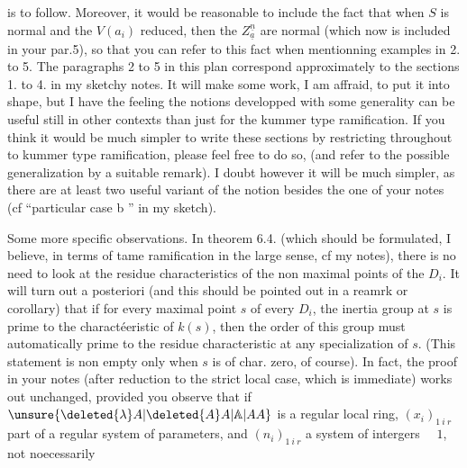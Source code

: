 is to follow. Moreover, it would be reasonable to include the fact that when $S$ is normal and the $V(a_i)$ reduced, then the $Z^{\underline{n}}_{\underline{a}}$ are normal (which now is included in your par.5), so that you can refer to this fact when mentionning examples in  2. to 5. The paragraphs 2 to 5 in this plan correspond approximately to the sections 1. to 4. in my sketchy notes. It will make some work, I am affraid, to put it into shape, but I have the feeling the notions developped with some generality can be useful still in other contexts than just for the kummer type ramification. If you think it would be much simpler to write these sections by restricting throughout to kummer type ramification, please feel free to do so, (and refer to the possible generalization by a suitable remark). I doubt however it will be much simpler, as there are at least two useful variant of the notion besides the one of your notes (cf ``particular case b '' in my sketch).

Some more specific observations. In theorem 6.4. (which should be formulated, I believe, in terms of tame ramification in the large sense, cf my notes), there is no need to look at the residue characteristics of the non maximal points of the $D_i$. It will turn out a posteriori (and this should be pointed out in a reamrk or corollary) that  if for every maximal point $s$ of every $D_i$, the inertia group at $s$ is prime to the charactéeristic of $k(s)$, then the order of this group must  automatically prime to the residue characteristic at any specialization of $s$. (This statement is non empty only when $s$ is of char. zero, of course). In fact, the proof in your notes (after reduction to the strict local case, which is immediate) works out unchanged, provided you observe that if $\unsure{\deleted{\lambda}A|\deleted{A}A|\mathbb{A}|AA}$ is a regular local ring, $(x_i)_{1\ i\ r}$ part of a regular system of parameters, and $(n_i)_{1\ i\ r}$ a system of intergers $\quad1$, not noecessarily
